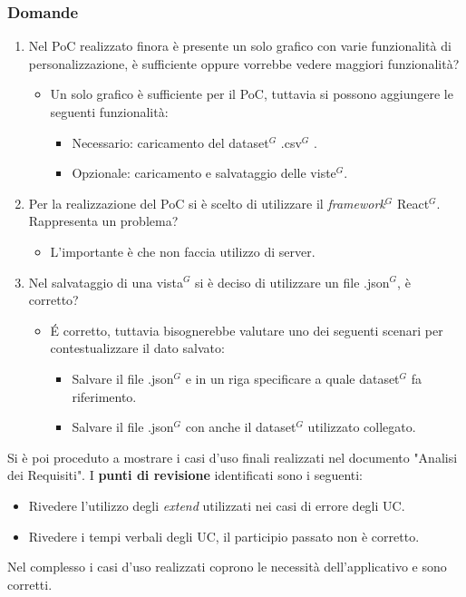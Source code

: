 \subsubsection{Domande}
\begin{enumerate}
	\item Nel PoC realizzato finora è presente un solo grafico con varie funzionalità di personalizzazione, è sufficiente oppure vorrebbe vedere maggiori funzionalità?
	\begin{itemize}
		\item Un solo grafico è sufficiente per il PoC, tuttavia si possono aggiungere le seguenti funzionalità:
		\begin{itemize}
			\item Necessario: caricamento del dataset$^{G}$ .csv$^{G}$ .
			\item Opzionale: caricamento e salvataggio delle viste$^{G}$.
		\end{itemize}
	\end{itemize}
	\item Per la realizzazione del PoC si è scelto di utilizzare il \textit{framework$^{G}$} React$^{G}$. Rappresenta un problema?
	\begin{itemize}
		\item L'importante è che non faccia utilizzo di server.
	\end{itemize}
	\item Nel salvataggio di una vista$^{G}$ si è deciso di utilizzare un file .json$^{G}$, è corretto?
	\begin{itemize}
		\item \' E corretto, tuttavia bisognerebbe valutare uno dei seguenti scenari per contestualizzare il dato salvato:
		\begin{itemize}
			\item Salvare il file .json$^{G}$ e in un riga specificare a quale dataset$^{G}$ fa riferimento.
			\item Salvare il file .json$^{G}$ con anche il dataset$^{G}$ utilizzato collegato.
		\end{itemize}
	\end{itemize}
\end{enumerate}

\noindent
Si è poi proceduto a mostrare i casi d'uso finali realizzati nel documento "Analisi dei Requisiti".
I \textbf{punti di revisione} identificati sono i seguenti:
\begin{itemize}
	\item Rivedere l'utilizzo degli \textit{extend} utilizzati nei casi di errore degli UC.
	\item Rivedere i tempi verbali degli UC, il participio passato non è corretto.
\end{itemize}
Nel complesso i casi d'uso realizzati coprono le necessità dell'applicativo e sono corretti.

